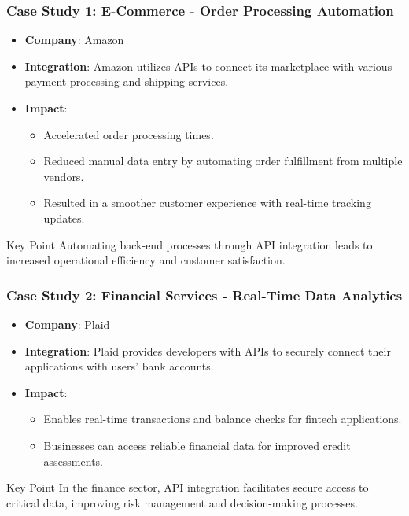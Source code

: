 \documentclass[aspectratio=169]{beamer}
\begin{document}
\begin{frame}[fragile]
    \frametitle{Case Study 1: E-Commerce - Order Processing Automation}
    \begin{itemize}
        \item \textbf{Company}: Amazon
        \item \textbf{Integration}: Amazon utilizes APIs to connect its marketplace with various payment processing and shipping services.
        \item \textbf{Impact}:
        \begin{itemize}
            \item Accelerated order processing times.
            \item Reduced manual data entry by automating order fulfillment from multiple vendors.
            \item Resulted in a smoother customer experience with real-time tracking updates.
        \end{itemize}
    \end{itemize}
    \begin{block}{Key Point}
        Automating back-end processes through API integration leads to increased operational efficiency and customer satisfaction.
    \end{block}
\end{frame}

\begin{frame}[fragile]
    \frametitle{Case Study 2: Financial Services - Real-Time Data Analytics}
    \begin{itemize}
        \item \textbf{Company}: Plaid
        \item \textbf{Integration}: Plaid provides developers with APIs to securely connect their applications with users’ bank accounts.
        \item \textbf{Impact}:
        \begin{itemize}
            \item Enables real-time transactions and balance checks for fintech applications.
            \item Businesses can access reliable financial data for improved credit assessments.
        \end{itemize}
    \end{itemize}
    \begin{block}{Key Point}
        In the finance sector, API integration facilitates secure access to critical data, improving risk management and decision-making processes.
    \end{block}
\end{frame}
\end{document}
